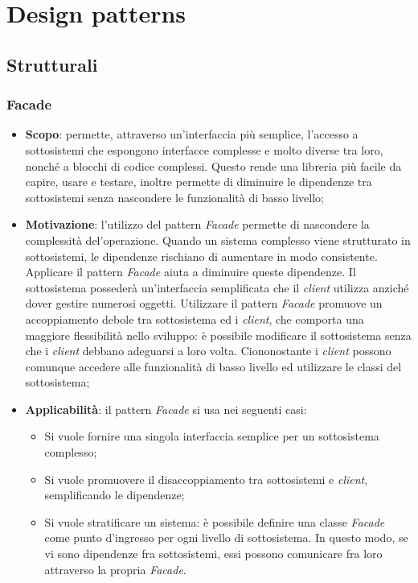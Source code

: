 \newpage
\section{Design patterns}
\subsection{Strutturali}
\subsubsection{Facade}
\begin{itemize}
\item \textbf{Scopo}: permette, attraverso un'interfaccia più semplice, l'accesso a sottosistemi che espongono interfacce complesse e molto diverse tra loro, nonché a blocchi di codice complessi. Questo rende una libreria più facile da capire, usare e testare, inoltre permette di diminuire le dipendenze tra sottosistemi senza nascondere le funzionalità di basso livello;

\item \textbf{Motivazione}: l'utilizzo del pattern \textit{Facade} permette di nascondere la complessità del'operazione. Quando un sistema complesso viene strutturato in sottosistemi, le dipendenze rischiano di aumentare in modo consistente. Applicare il pattern \textit{Facade} aiuta a diminuire queste dipendenze. Il sottosistema possederà un'interfaccia semplificata che il \textit{client} utilizza anziché dover gestire numerosi oggetti. Utilizzare il pattern \textit{Facade} promuove un accoppiamento debole tra sottosistema ed i \textit{client}, che comporta una maggiore flessibilità nello sviluppo: è possibile modificare il sottosistema senza che i \textit{client} debbano adeguarsi a loro volta. Ciononostante i \textit{client} possono comunque accedere alle funzionalità di basso livello ed utilizzare le classi del sottosistema;

\item \textbf{Applicabilità}: il pattern \textit{Facade} si usa nei seguenti casi:
	\begin{itemize}
		\item Si vuole fornire una singola interfaccia semplice per un sottosistema complesso;
		\item Si vuole promuovere il disaccoppiamento tra sottosistemi e \textit{client}, semplificando le dipendenze;
		\item Si vuole stratificare un sistema: è possibile definire una classe \textit{Facade} come punto d'ingresso per ogni livello di sottosistema. In questo modo, se vi sono dipendenze fra sottosistemi, essi possono comunicare fra loro attraverso la propria \textit{Facade}.
	\end{itemize}
	

\end{itemize}
